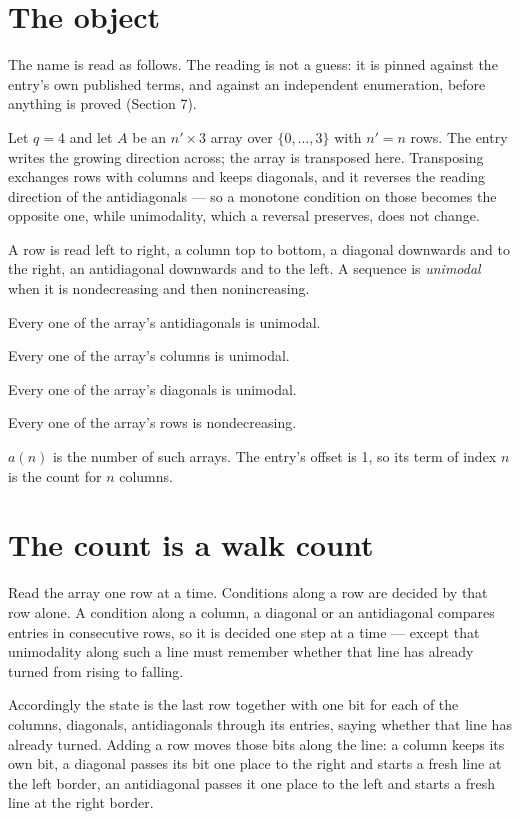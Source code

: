 \documentclass[11pt]{article}
\theoremstyle{definition}
\begin{document}
\section{The object}

The name is read as follows. The reading is not a guess: it is pinned against the entry's own published terms, and against an independent enumeration, before anything is proved (Section 7).

Let $q = 4$ and let $A$ be an $n' \times 3$ array over $\{0,\dots,3\}$ with $n' = n$ rows. The entry writes the growing direction across; the array is transposed here. Transposing exchanges rows with columns and keeps diagonals, and it reverses the reading direction of the antidiagonals --- so a monotone condition on those becomes the opposite one, while unimodality, which a reversal preserves, does not change.

A row is read left to right, a column top to bottom, a diagonal downwards and to the right, an antidiagonal downwards and to the left. A sequence is {\itshape unimodal} when it is nondecreasing and then nonincreasing.

Every one of the array's antidiagonals is unimodal.

Every one of the array's columns is unimodal.

Every one of the array's diagonals is unimodal.

Every one of the array's rows is nondecreasing.

$a(n)$ is the number of such arrays. The entry's offset is 1, so its term of index $n$ is the count for $n$ columns.

\section{The count is a walk count}

Read the array one row at a time. Conditions along a row are decided by that row alone. A condition along a column, a diagonal or an antidiagonal compares entries in consecutive rows, so it is decided one step at a time --- except that unimodality along such a line must remember whether that line has already turned from rising to falling.

Accordingly the state is the last row together with one bit for each of the columns, diagonals, antidiagonals through its entries, saying whether that line has already turned. Adding a row moves those bits along the line: a column keeps its own bit, a diagonal passes its bit one place to the right and starts a fresh line at the left border, an antidiagonal passes it one place to the left and starts a fresh line at the right border.
\end{document}
